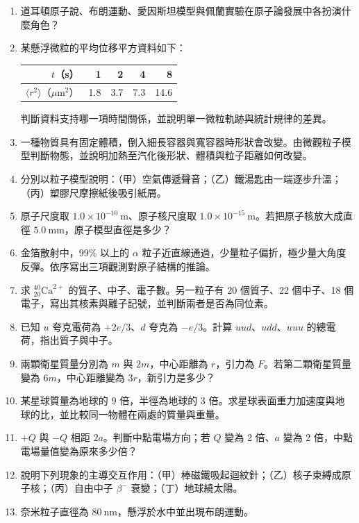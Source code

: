 \documentclass[11pt,a4paper]{article}
\newcounter{none}
\begin{document}
\begin{enumerate}
\def\labelenumi{\arabic{enumi}.}
\item
  道耳頓原子說、布朗運動、愛因斯坦模型與佩蘭實驗在原子論發展中各扮演什麼角色？
\item
  某懸浮微粒的平均位移平方資料如下：

  {\def\LTcaptype{none} %
  \begin{longtable}[]{@{}rrrrr@{}}
  \toprule\noalign{}
  \(t\)（s） & 1 & 2 & 4 & 8 \\
  \midrule\noalign{}
  \endhead
  \bottomrule\noalign{}
  \endlastfoot
  \(\langle r^2\rangle\)（\(\mu\mathrm m^2\)） & 1.8 & 3.7 & 7.3 & 14.6 \\
  \end{longtable}
  }

  判斷資料支持哪一項時間關係，並說明單一微粒軌跡與統計規律的差異。
\item
  一種物質具有固定體積，倒入細長容器與寬容器時形狀會改變。由微觀粒子模型判斷物態，並說明加熱至汽化後形狀、體積與粒子距離如何改變。
\item
  分別以粒子模型說明：（甲）空氣傳遞聲音；（乙）鐵湯匙由一端逐步升溫；（丙）塑膠尺摩擦紙後吸引紙屑。
\item
  原子尺度取 \(1.0\times10^{-10}\ \mathrm m\)、原子核尺度取 \(1.0\times10^{-15}\ \mathrm m\)。若把原子核放大成直徑 \(5.0\ \mathrm{mm}\)，原子模型直徑是多少？
\item
  金箔散射中，99\% 以上的 \(\alpha\) 粒子近直線通過，少量粒子偏折，極少量大角度反彈。依序寫出三項觀測對原子結構的推論。
\item
  求 \({}^{40}_{20}\mathrm{Ca}^{2+}\) 的質子、中子、電子數。另一粒子有 20 個質子、22 個中子、18 個電子，寫出其核素與離子記號，並判斷兩者是否為同位素。
\item
  已知 \(u\) 夸克電荷為 \(+2e/3\)、\(d\) 夸克為 \(-e/3\)。計算 \(uud\)、\(udd\)、\(uuu\) 的總電荷，指出質子與中子。
\item
  兩顆衛星質量分別為 \(m\) 與 \(2m\)，中心距離為 \(r\)，引力為 \(F\)。若第二顆衛星質量變為 \(6m\)，中心距離變為 \(3r\)，新引力是多少？
\item
  某星球質量為地球的 \(9\) 倍，半徑為地球的 \(3\) 倍。求星球表面重力加速度與地球的比，並比較同一物體在兩處的質量與重量。
\item
  \(+Q\) 與 \(-Q\) 相距 \(2a\)。判斷中點電場方向；若 \(Q\) 變為 2 倍、\(a\) 變為 2 倍，中點電場量值變為原來多少倍？
\item
  說明下列現象的主導交互作用：（甲）棒磁鐵吸起迴紋針；（乙）核子束縛成原子核；（丙）自由中子 \(\beta^-\) 衰變；（丁）地球繞太陽。
\item
  奈米粒子直徑為 \(80\ \mathrm{nm}\)，懸浮於水中並出現布朗運動。
\end{enumerate}
\end{document}

